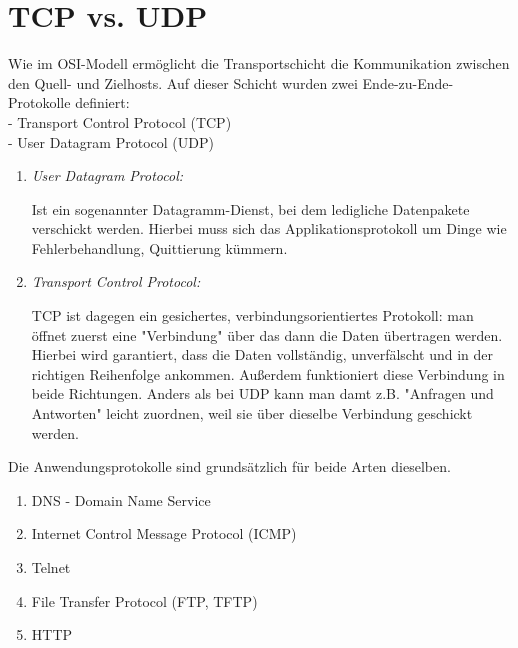 \documentclass[11pt]{article}
\begin{document}
    \section{TCP vs. UDP}

    Wie im OSI-Modell ermöglicht die Transportschicht die Kommunikation
    zwischen den Quell- und Zielhosts. Auf dieser Schicht wurden zwei
    Ende-zu-Ende-Protokolle definiert:\\
    - Transport Control Protocol (TCP)\\
    - User Datagram Protocol (UDP)\\

    \begin{enumerate}
        \item \emph{User Datagram Protocol:}
        \begin{addmargin}[1em]{1em}
            Ist ein sogenannter Datagramm-Dienst, bei dem ledigliche
            Datenpakete verschickt werden. Hierbei muss sich das
            Applikationsprotokoll um Dinge wie Fehlerbehandlung, Quittierung kümmern.
        \end{addmargin}
        \item \emph{Transport Control Protocol:}
        \begin{addmargin}[1em]{1em}
            TCP ist dagegen ein gesichertes, verbindungsorientiertes Protokoll:
            man öffnet zuerst eine "Verbindung" über das dann die Daten übertragen
            werden. Hierbei wird garantiert, dass die Daten vollständig, unverfälscht
            und in der richtigen Reihenfolge ankommen.
            Außerdem funktioniert diese Verbindung in beide Richtungen.
            Anders als bei UDP kann man damt z.B. "Anfragen und Antworten" leicht zuordnen,
            weil sie über dieselbe Verbindung geschickt werden.\\

        \end{addmargin}
    \end{enumerate}

    Die Anwendungsprotokolle sind grundsätzlich für beide Arten dieselben.
    \begin{addmargin}[1em]{1em}
        \begin{enumerate}[$\diamond$]
            \item DNS - Domain Name Service
            \item Internet Control Message Protocol (ICMP)
            \item Telnet
            \item File Transfer Protocol (FTP, TFTP)
            \item HTTP
        \end{enumerate}
    \end{addmargin}
\end{document}

